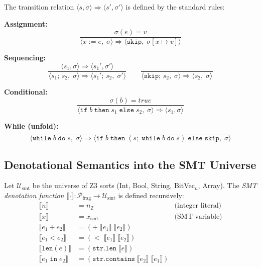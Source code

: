 \documentclass[11pt]{article}
\newcommand{\denot}[1]{\llbracket #1 \rrbracket}
\newcommand{\opsem}{\Rightarrow}
\newcommand{\PythonFrag}{\mathcal{P}_{\mathrm{frag}}}
\newcommand{\SmtUni}{\mathcal{U}_{\mathrm{smt}}}
\begin{document}
\begin{definition}\label{def:transitions}
The transition relation $\langle s, \sigma \rangle \opsem
\langle s', \sigma' \rangle$ is defined by the standard rules:

\medskip
\noindent\textbf{Assignment:}
\[
  \frac{\sigma(e) = v}
       {\langle x := e,\; \sigma \rangle \opsem
        \langle \mathtt{skip},\; \sigma[x \mapsto v] \rangle}
\]

\medskip
\noindent\textbf{Sequencing:}
\[
  \frac{\langle s_1, \sigma \rangle \opsem \langle s_1', \sigma' \rangle}
       {\langle s_1;\, s_2,\; \sigma \rangle \opsem
        \langle s_1';\, s_2,\; \sigma' \rangle}
\qquad
  \frac{}
       {\langle \mathtt{skip};\, s_2,\; \sigma \rangle \opsem
        \langle s_2,\; \sigma \rangle}
\]

\medskip
\noindent\textbf{Conditional:}
\[
  \frac{\sigma(b) = \mathit{true}}
       {\langle \mathtt{if}\; b\; \mathtt{then}\; s_1\; \mathtt{else}\; s_2,
        \; \sigma \rangle \opsem \langle s_1, \sigma \rangle}
\]

\medskip
\noindent\textbf{While (unfold):}
\[
  \frac{}
       {\langle \mathtt{while}\; b\; \mathtt{do}\; s,\; \sigma \rangle
        \opsem
        \langle \mathtt{if}\; b\; \mathtt{then}\; (s;\;
        \mathtt{while}\; b\; \mathtt{do}\; s)\;
        \mathtt{else}\; \mathtt{skip},\; \sigma \rangle}
\]
\end{definition}

\subsection{Denotational Semantics into the SMT Universe}

\begin{definition}\label{def:smt-denotation}
Let $\SmtUni$ be the universe of Z3 sorts (Int, Bool, String,
BitVec$_n$, Array).  The \emph{SMT denotation function}
$\denot{\cdot} : \PythonFrag \to \SmtUni$ is defined recursively:
\begin{align*}
  \denot{n} &= n_{\mathbb{Z}} & \text{(integer literal)} \\
  \denot{x} &= x_{\mathrm{smt}} & \text{(SMT variable)} \\
  \denot{e_1 + e_2} &= (\mathtt{+}\; \denot{e_1}\; \denot{e_2}) \\
  \denot{e_1 < e_2} &= (\mathtt{<}\; \denot{e_1}\; \denot{e_2}) \\
  \denot{\mathtt{len}(e)} &= (\mathtt{str.len}\; \denot{e}) \\
  \denot{e_1 \;\mathtt{in}\; e_2} &=
    (\mathtt{str.contains}\; \denot{e_2}\; \denot{e_1})
\end{align*}
\end{definition}
\end{document}
